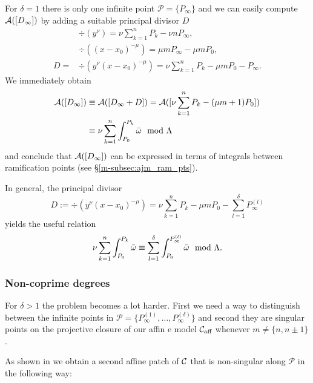 \documentclass[main.tex]{subfiles}
\begin{document}
  For $\delta = 1$ there is only one infinite point $\mathcal{P} = \{ P_{\infty} \}$ and
  we can easily compute  $\mathcal{A}( [D_{\infty}] )$ by adding a suitable
  principal divisor $D$
    \begin{align*}
      &\div(y^{\nu})=  \nu \sum_{k = 1}^n P_k - \nu n P_{\infty},\\
      &\div((x-x_0)^{-\mu})  =  \mu m P_{\infty}-\mu m P_0  ,\\
      D  =  & \div(y^{\nu}(x-x_0)^{-\mu})  = \nu \sum_{k = 1}^n P_k - \mu m P_0 - P_{\infty}.
    \end{align*}
    We immediately obtain
    \begin{align*}
     \mathcal{A}( [D_{\infty}] )  & \equiv  \mathcal{A}([D_{\infty} + D])  =  \mathcal{A}( [ \nu \sum_{k = 1}^n P_k - (\mu m + 1) P_0 ]  ) \\ &
      \equiv   \nu \sum_{k=1}^n \int_{P_0}^{P_k} \bar{\omega} \mod \Lambda
    \end{align*}
    and conclude that $\mathcal{A}( [D_{\infty}] )$ can be expressed in terms of integrals between
    ramification points (see \S \ref{m-subsec:ajm_ram_pts}).
  \begin{rmk}\label{rmk:sum_infty_pts}
  In general, the principal divisor
  \begin{equation*}
    D  := \div(y^{\nu}(x-x_0)^{-\mu}) = \nu \sum_{k = 1}^n P_k - \mu m P_0 - \sum_{l = 1}^{\delta} P^{(l)}_{\infty}
  \end{equation*}
  yields the useful relation
  \begin{equation*}
  \nu \sum_{k=1}^n \int_{P_0}^{P_k} \bar{\omega} \equiv \sum_{l = 1}^{\delta} \int_{P_0}^{P^{(l)}_{\infty}} \bar{\omega} \mod \Lambda.
  \end{equation*}
  \end{rmk}



 \subsubsection{Non-coprime degrees}\label{subsec:ajm_inf_ncop}

  For $\delta > 1$ the problem becomes a lot harder. First we need a way to distinguish between the infinite points in $\mathcal{P}
  = \{ P_{\infty}^{(1)},\dots, P_{\infty}^{(\delta)} \}$ and second they are singular points
  on the projective closure of our affin
  e model $\mathcal{C}_{\text{aff}}$
  whenever $m \ne \{n,n\pm1\}$.

  As shown in \cite[\S 1]{CT1996} we obtain a second affine patch of $\mathcal{C}$ that is non-singular along $\mathcal{P}$
  in the following way:
\end{document}
